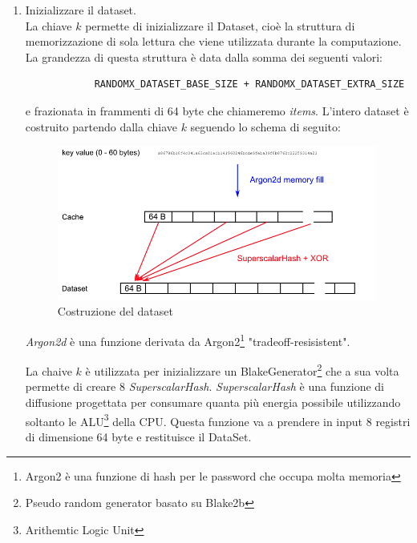 \documentclass[12pt,a4paper]{article}
\begin{document}
\begin{enumerate}
    \item Inizializzare il dataset.\\
        La chiave $k$ permette di inizializzare il Dataset, cioè la struttura di
        memorizzazione di sola lettura che viene utilizzata durante la
        computazione. La grandezza di questa struttura è data dalla somma dei
        seguenti valori:

        \begin{verbatim}
            RANDOMX_DATASET_BASE_SIZE + RANDOMX_DATASET_EXTRA_SIZE
        \end{verbatim}

        e frazionata in frammenti di 64 byte che chiameremo \textit{items}.
        L'intero dataset è costruito partendo dalla chiave $k$ seguendo lo
        schema di seguito:

        \begin{figure}[ht]
            \centering
            \includegraphics[width=0.99\textwidth]{./images/dataset_construction.png}
            \caption{Costruzione del dataset}
            \label{fig:data_construction}
        \end{figure}

        \textit{Argon2d} è una funzione derivata da Argon2\footnote{Argon2 è una
        funzione di hash per le password che occupa molta memoria}
        "tradeoff-resisistent".

        La chaive $k$ è utilizzata per inizializzare un
        BlakeGenerator\footnote{Pseudo random generator basato su Blake2b} che a
        sua volta permette di creare 8 \textit{SuperscalarHash}.
        \textit{SuperscalarHash} è una funzione di diffusione progettata per
        consumare quanta più energia possibile utilizzando soltanto le
        ALU\footnote{Arithemtic Logic Unit} della CPU. Questa funzione va a
        prendere in input 8 registri di dimensione 64 byte e restituisce il
        DataSet.


\end{enumerate}
\end{document}
